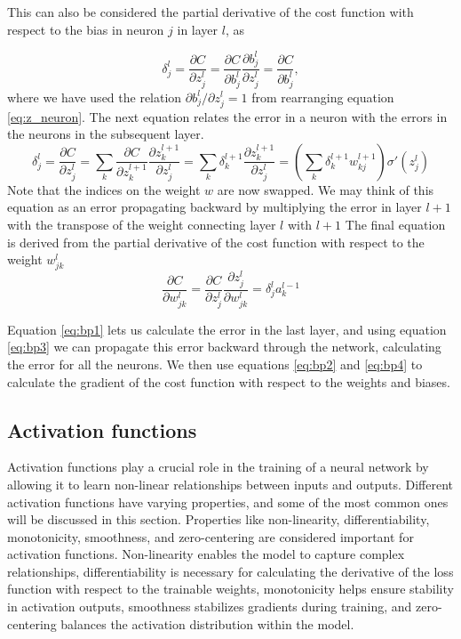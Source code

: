 This can also be considered the partial derivative of the cost function with respect to the bias in neuron $j$ in layer $l$, as 

\begin{equation}\label{eq:bp2}
    \delta_j^l = \frac{\partial C}{\partial z_j^l} = \frac{\partial C}{\partial b_j^l} \frac{\partial b_j^l }{\partial z_j^l} = \frac{\partial C}{\partial b_j^l},
\end{equation}
where we have used the relation $\partial b_j^l / \partial z_j^l = 1$ from rearranging equation \eqref{eq:z_neuron}.
The next equation relates the error in a neuron with the errors in the neurons in the subsequent layer.
\begin{equation}\label{eq:bp3}
    \delta_j^l = \frac{\partial C}{\partial z_j^l} = \sum_k \frac{\partial C}{\partial z_k^{l+1}} \frac{\partial z_k^{l+1}}{\partial z_j^l} = \sum_k \delta_k^{l+1} \frac{\partial z_k^{l+1}}{\partial z_j^l} = \left( \sum_k \delta_k^{l+1} w_{kj}^{l+1} \right) \sigma '(z_j^l)
\end{equation}
Note that the indices on the weight $w$ are now swapped.
We may think of this equation as an error propagating backward by multiplying the error in layer $l+1$ with the transpose of the weight connecting layer $l$ with $l+1$
The final equation is derived from the partial derivative of the cost function with respect to the weight $w_{jk}^l$
\begin{equation}\label{eq:bp4}
    \frac{\partial C}{\partial w_{jk}^l} = \frac{\partial C}{\partial z_j^l} \frac{\partial z_j^l}{\partial w_{jk}^l} = \delta_j^l a_k^{l-1}
\end{equation}

Equation \eqref{eq:bp1} lets us calculate the error in the last layer, and using equation \eqref{eq:bp3} we can propagate this error backward through the network, calculating the error for all the neurons.
We then use equations \eqref{eq:bp2} and \eqref{eq:bp4} to calculate the gradient of the cost function with respect to the weights and biases.


\subsection{Activation functions}
Activation functions play a crucial role in the training of a neural network by allowing it to learn non-linear relationships between inputs and outputs.
Different activation functions have varying properties, and some of the most common ones will be discussed in this section.
Properties like non-linearity, differentiability, monotonicity, smoothness, and zero-centering are considered important for activation functions.
Non-linearity enables the model to capture complex relationships, differentiability is necessary for calculating the derivative of the loss function with respect to the trainable weights, monotonicity helps ensure stability in activation outputs, smoothness stabilizes gradients during training, and zero-centering balances the activation distribution within the model.

